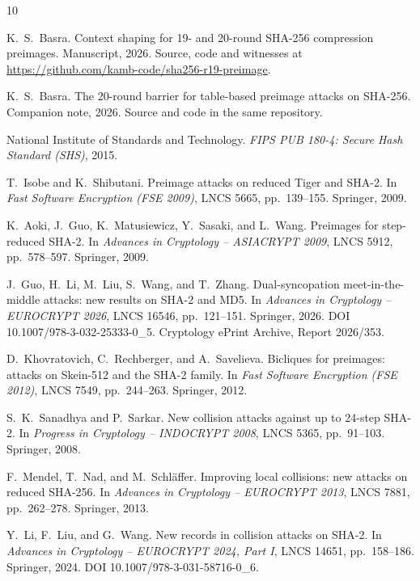 \documentclass[11pt,a4paper]{article}
\begin{document}
\begin{thebibliography}{10}

K.~S.~Basra.
\newblock Context shaping for 19- and 20-round {SHA-256} compression
  preimages.
\newblock Manuscript, 2026.  Source, code and witnesses at \url{https://github.com/kamb-code/sha256-r19-preimage}.

K.~S.~Basra.
\newblock The 20-round barrier for table-based preimage attacks on
  {SHA-256}.
\newblock Companion note, 2026.  Source and code in the same repository.

National Institute of Standards and Technology.
\newblock \emph{{FIPS PUB 180-4}: Secure Hash Standard ({SHS})}, 2015.

T.~Isobe and K.~Shibutani.
\newblock Preimage attacks on reduced {Tiger} and {SHA-2}.
\newblock In \emph{Fast Software Encryption (FSE 2009)}, LNCS 5665,
  pp.~139--155. Springer, 2009.

K.~Aoki, J.~Guo, K.~Matusiewicz, Y.~Sasaki, and L.~Wang.
\newblock Preimages for step-reduced {SHA-2}.
\newblock In \emph{Advances in Cryptology -- ASIACRYPT 2009}, LNCS 5912,
  pp.~578--597. Springer, 2009.

J.~Guo, H.~Li, M.~Liu, S.~Wang, and T.~Zhang.
\newblock Dual-syncopation meet-in-the-middle attacks: new results on
  {SHA-2} and {MD5}.
\newblock In \emph{Advances in Cryptology -- EUROCRYPT 2026}, LNCS 16546, pp.~121--151. Springer, 2026.
  DOI 10.1007/978-3-032-25333-0\_5.  Cryptology ePrint Archive, Report
  2026/353.

D.~Khovratovich, C.~Rechberger, and A.~Savelieva.
\newblock Bicliques for preimages: attacks on {Skein-512} and the {SHA-2}
  family.
\newblock In \emph{Fast Software Encryption (FSE 2012)}, LNCS 7549,
  pp.~244--263. Springer, 2012.

S.~K.~Sanadhya and P.~Sarkar.
\newblock New collision attacks against up to 24-step {SHA-2}.
\newblock In \emph{Progress in Cryptology -- INDOCRYPT 2008}, LNCS 5365,
  pp.~91--103. Springer, 2008.

F.~Mendel, T.~Nad, and M.~Schl\"affer.
\newblock Improving local collisions: new attacks on reduced {SHA-256}.
\newblock In \emph{Advances in Cryptology -- EUROCRYPT 2013}, LNCS 7881,
  pp.~262--278. Springer, 2013.

Y.~Li, F.~Liu, and G.~Wang.
\newblock New records in collision attacks on {SHA-2}.
\newblock In \emph{Advances in Cryptology -- EUROCRYPT 2024, Part I}, LNCS 14651,
  pp.~158--186. Springer, 2024.  DOI 10.1007/978-3-031-58716-0\_6.


\end{thebibliography}
\end{document}
